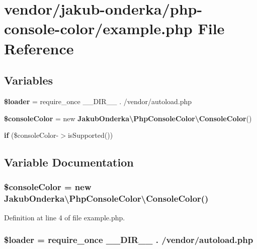 \section{vendor/jakub-\/onderka/php-\/console-\/color/example.php File Reference}
\label{jakub-onderka_2php-console-color_2example_8php}
\subsection*{Variables}
\begin{DoxyCompactItemize}
\item 
{\bf \$loader} = require\+\_\+once \+\_\+\+\_\+\+D\+I\+R\+\_\+\+\_\+ . \textquotesingle{}/vendor/autoload.\+php\textquotesingle{}
\item 
{\bf \$console\+Color} = new {\bf Jakub\+Onderka\textbackslash{}\+Php\+Console\+Color\textbackslash{}\+Console\+Color}()
\item 
{\bf if} (\$console\+Color-\/$>$is\+Supported())
\end{DoxyCompactItemize}


\subsection{Variable Documentation}
\subsubsection[{\$console\+Color}]{\setlength{\rightskip}{0pt plus 5cm}\$console\+Color = new {\bf Jakub\+Onderka\textbackslash{}\+Php\+Console\+Color\textbackslash{}\+Console\+Color}()}\label{jakub-onderka_2php-console-color_2example_8php_a287830d0d13bb61e2cce680b038c430f}


Definition at line 4 of file example.\+php.

\subsubsection[{\$loader}]{\setlength{\rightskip}{0pt plus 5cm}\$loader = require\+\_\+once \+\_\+\+\_\+\+D\+I\+R\+\_\+\+\_\+ . \textquotesingle{}/vendor/autoload.\+php\textquotesingle{}}\label{jakub-onderka_2php-console-color_2example_8php_ab832f4c463ee1c9ba2e9464265f7ea3b}


